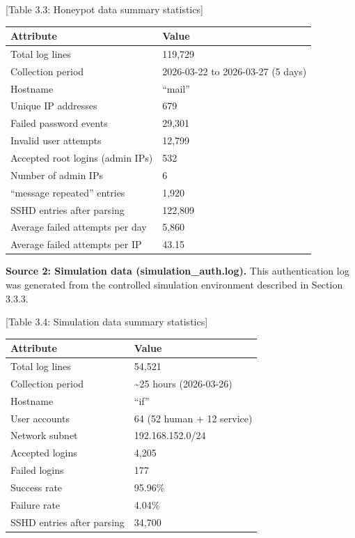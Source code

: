 \documentclass[
  a4paper]{report}
\newcounter{none} %
\begin{document}
{[}Table 3.3: Honeypot data summary statistics{]}

{\def\LTcaptype{none} %
\begin{longtable}[]{@{}ll@{}}
\toprule\noalign{}
Attribute & Value \\
\midrule\noalign{}
\endhead
\bottomrule\noalign{}
\endlastfoot
Total log lines & 119,729 \\
Collection period & 2026-03-22 to 2026-03-27 (5 days) \\
Hostname & ``mail'' \\
Unique IP addresses & 679 \\
Failed password events & 29,301 \\
Invalid user attempts & 12,799 \\
Accepted root logins (admin IPs) & 532 \\
Number of admin IPs & 6 \\
``message repeated'' entries & 1,920 \\
SSHD entries after parsing & 122,809 \\
Average failed attempts per day & 5,860 \\
Average failed attempts per IP & 43.15 \\
\end{longtable}
}

\textbf{Source 2: Simulation data (simulation\_auth.log).} This
authentication log was generated from the controlled simulation
environment described in Section 3.3.3.

{[}Table 3.4: Simulation data summary statistics{]}

{\def\LTcaptype{none} %
\begin{longtable}[]{@{}ll@{}}
\toprule\noalign{}
Attribute & Value \\
\midrule\noalign{}
\endhead
\bottomrule\noalign{}
\endlastfoot
Total log lines & 54,521 \\
Collection period & \textasciitilde25 hours (2026-03-26) \\
Hostname & ``if'' \\
User accounts & 64 (52 human + 12 service) \\
Network subnet & 192.168.152.0/24 \\
Accepted logins & 4,205 \\
Failed logins & 177 \\
Success rate & 95.96\% \\
Failure rate & 4.04\% \\
SSHD entries after parsing & 34,700 \\
\end{longtable}
}
\end{document}
